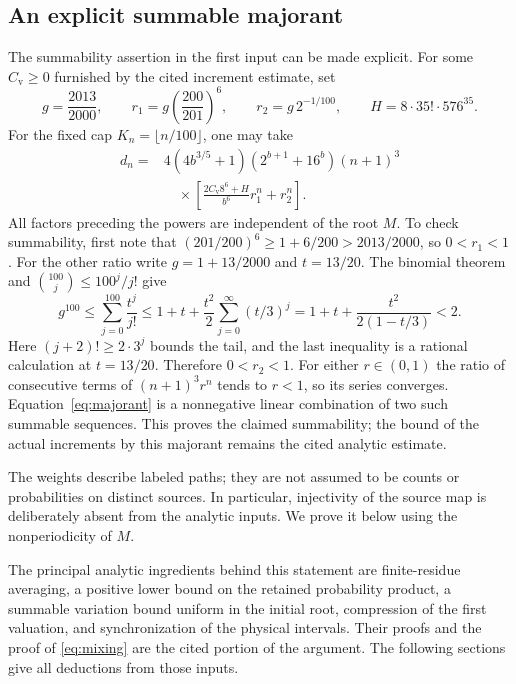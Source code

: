 \documentclass[11pt]{article}
\begin{document}
\subsection{An explicit summable majorant}
The summability assertion in the first input can be made explicit. For
some $C_{\mathrm v}\ge0$ furnished by the cited increment estimate, set
\[
 g=\frac{2013}{2000},\qquad
 r_1=g\left(\frac{200}{201}\right)^6,\qquad
 r_2=g\,2^{-1/100},\qquad
 H=8\cdot35!\cdot576^{35}.
\]
For the fixed cap $K_n=\lfloor n/100\rfloor$, one may take
\begin{equation}\label{eq:majorant}
 \begin{split}
 d_n={}&4(4b^{3/5}+1)(2^{b+1}+16^b)(n+1)^3\\
 &\quad\times\left[
 \frac{2C_{\mathrm v}8^6+H}{b^6}r_1^n+r_2^n\right].
 \end{split}
\end{equation}
All factors preceding the powers are independent of the root $M$.
To check summability, first note that
$(201/200)^6\ge1+6/200>2013/2000$, so $0<r_1<1$.
For the other ratio write $g=1+13/2000$ and $t=13/20$.
The binomial theorem and $\binom{100}{j}\le100^j/j!$ give
\[
 g^{100}\le\sum_{j=0}^{100}\frac{t^j}{j!}
 \le1+t+\frac{t^2}{2}\sum_{j=0}^{\infty}(t/3)^j
 =1+t+\frac{t^2}{2(1-t/3)}<2.
\]
Here $(j+2)!\ge2\cdot3^j$ bounds the tail, and the last inequality
is a rational calculation at $t=13/20$. Therefore $0<r_2<1$.
For either $r\in(0,1)$ the ratio of consecutive terms of
$(n+1)^3r^n$ tends to $r<1$, so its series converges.
Equation~\eqref{eq:majorant} is a nonnegative linear combination of
two such summable sequences. This proves the claimed summability;
the bound of the actual increments by this majorant remains the cited
analytic estimate.

The weights describe labeled paths; they are not assumed to be counts or
probabilities on distinct sources. In particular, injectivity of the source
map is deliberately absent from the analytic inputs. We prove it below
using the nonperiodicity of $M$.

The principal analytic ingredients behind this statement are finite-residue
averaging, a positive lower bound on the retained probability product,
a summable variation bound uniform in the initial root, compression of
the first valuation, and synchronization of the physical intervals.
Their proofs and the proof of \eqref{eq:mixing} are the cited portion of
the argument. The following sections give all deductions from those inputs.
\end{document}
